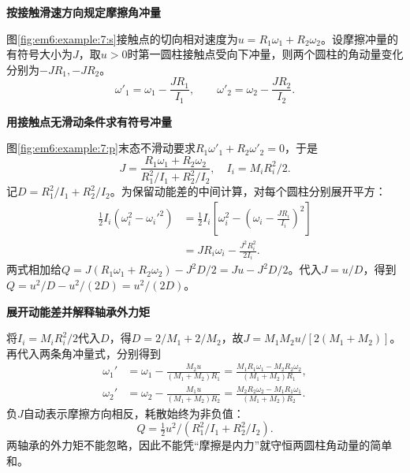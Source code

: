 \begin{solution}\textbf{按接触滑速方向规定摩擦角冲量}\par\nobreak
图\ref{fig:em6:example:7:s}接触点的切向相对速度为$u=R_1\omega_1+R_2\omega_2$。设摩擦冲量的有符号大小为$J$，取$u>0$时第一圆柱接触点受向下冲量，则两个圆柱的角动量变化分别为$-JR_1,-JR_2$。
\[\omega'_1=\omega_1-\frac{JR_1}{I_1},\qquad\omega'_2=\omega_2-\frac{JR_2}{I_2}.\]



\par\medskip{}\noindent\textbf{用接触点无滑动条件求有符号冲量}\par\nobreak
图\ref{fig:em6:example:7:p}末态不滑动要求$R_1\omega'_1+R_2\omega'_2=0$，于是
\[\boxed{J=\frac{R_1\omega_1+R_2\omega_2}{R_1^2/I_1+R_2^2/I_2}},\quad I_i=M_iR_i^2/2.\]
记$D=R_1^2/I_1+R_2^2/I_2$。为保留动能差的中间计算，对每个圆柱分别展开平方：
\[
 \begin{aligned}
 \frac12 I_i(\omega_i^2-\omega_i'^2)
 &=\frac12I_i\left[\omega_i^2-
 \left(\omega_i-\frac{JR_i}{I_i}\right)^2\right]\\
 &=JR_i\omega_i-\frac{J^2R_i^2}{2I_i}.
 \end{aligned}
\]
两式相加给$Q=J(R_1\omega_1+R_2\omega_2)-J^2D/2=Ju-J^2D/2$。代入$J=u/D$，得到$Q=u^2/D-u^2/(2D)=u^2/(2D)$。



\par\medskip{}\noindent\textbf{展开动能差并解释轴承外力矩}\par\nobreak
将$I_i=M_iR_i^2/2$代入$D$，得$D=2/M_1+2/M_2$，故$J=M_1M_2u/[2(M_1+M_2)]$。再代入两条角冲量式，分别得到
\[
 \begin{aligned}
 \omega_1'&=\omega_1-\frac{M_2u}{(M_1+M_2)R_1}
 =\frac{M_1R_1\omega_1-M_2R_2\omega_2}{(M_1+M_2)R_1},\\
 \omega_2'&=\omega_2-\frac{M_1u}{(M_1+M_2)R_2}
 =\frac{M_2R_2\omega_2-M_1R_1\omega_1}{(M_1+M_2)R_2}.
 \end{aligned}
\]
负$J$自动表示摩擦方向相反，耗散始终为非负值：
\[\boxed{Q=\tfrac12u^2/(R_1^2/I_1+R_2^2/I_2)}.\]
两轴承的外力矩不能忽略，因此不能凭“摩擦是内力”就守恒两圆柱角动量的简单和。\end{solution}
